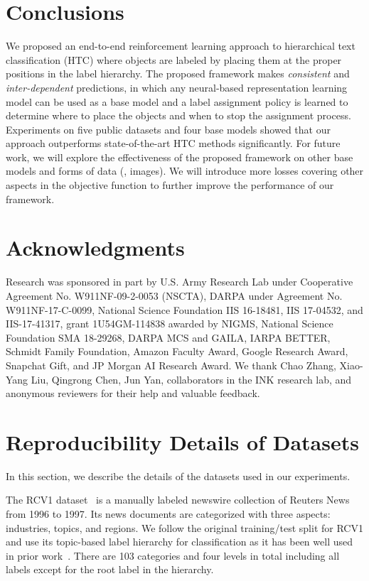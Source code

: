 \documentclass[11pt,a4paper]{article}
\begin{document}
\section{Conclusions}
We proposed an end-to-end reinforcement learning approach to hierarchical text classification (HTC) where objects are labeled by placing them at the proper positions in the label hierarchy.
The proposed framework makes \textit{consistent} and \textit{inter-dependent} predictions, in which any neural-based representation learning model can be used as a base model and a label assignment policy is learned to determine where to place the objects and when to stop the assignment process.
Experiments on five public datasets and four base models showed that our approach outperforms state-of-the-art HTC methods significantly.
For future work, we will explore the effectiveness of the proposed framework on other base models and forms of data (\eg, images).
We will introduce more losses covering other aspects in the objective function to further improve the performance of our framework. 
\section*{Acknowledgments}
 Research was sponsored in part by U.S. Army Research Lab under Cooperative Agreement No. W911NF-09-2-0053 (NSCTA), DARPA under Agreement No. W911NF-17-C-0099, National Science Foundation IIS 16-18481, IIS 17-04532, and IIS-17-41317, grant 1U54GM-114838 awarded by NIGMS, National Science Foundation SMA 18-29268, DARPA MCS and GAILA, IARPA BETTER, Schmidt Family Foundation, Amazon Faculty Award, Google Research Award, Snapchat Gift, and JP Morgan AI Research Award.
 We thank Chao Zhang, Xiao-Yang Liu, Qingrong Chen, Jun Yan, collaborators in the INK research lab, and anonymous reviewers for their help and valuable feedback.




\appendix

\clearpage
\section{Reproducibility Details of Datasets}
\label{app_data_stat}
In this section, we describe the details of the datasets used in our experiments.

The RCV1 dataset~\citep{lewis2004rcv1} is a manually labeled newswire collection of Reuters News from 1996 to 1997. 
Its news documents are categorized with three aspects: industries, topics, and regions.
We follow the original training/test split for RCV1 and use its topic-based label hierarchy for classification as it has been well used in prior work~\citep{gopal2013recursive,johnson2014effective,peng2018large,wehrmann2018hierarchical}.
There are 103 categories and four levels in total including all labels except for the root label in the hierarchy.
\end{document}
